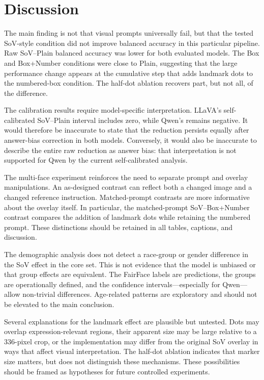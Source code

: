 \documentclass[lettersize,journal]{IEEEtran}
\begin{document}
\section{Discussion}
The main finding is not that visual prompts universally fail, but that the tested SoV-style condition did not improve balanced accuracy in this particular pipeline. Raw SoV--Plain balanced accuracy was lower for both evaluated models. The Box and Box+Number conditions were close to Plain, suggesting that the large performance change appears at the cumulative step that adds landmark dots to the numbered-box condition. The half-dot ablation recovers part, but not all, of the difference.

The calibration results require model-specific interpretation. LLaVA's self-calibrated SoV--Plain interval includes zero, while Qwen's remains negative. It would therefore be inaccurate to state that the reduction persists equally after answer-bias correction in both models. Conversely, it would also be inaccurate to describe the entire raw reduction as answer bias: that interpretation is not supported for Qwen by the current self-calibrated analysis.

The multi-face experiment reinforces the need to separate prompt and overlay manipulations. An as-designed contrast can reflect both a changed image and a changed reference instruction. Matched-prompt contrasts are more informative about the overlay itself. In particular, the matched-prompt SoV--Box+Number contrast compares the addition of landmark dots while retaining the numbered prompt. These distinctions should be retained in all tables, captions, and discussion.

The demographic analysis does not detect a race-group or gender difference in the SoV effect in the core set. This is not evidence that the model is unbiased or that group effects are equivalent. The FairFace labels are predictions, the groups are operationally defined, and the confidence intervals—especially for Qwen—allow non-trivial differences. Age-related patterns are exploratory and should not be elevated to the main conclusion.

Several explanations for the landmark effect are plausible but untested. Dots may overlap expression-relevant regions, their apparent size may be large relative to a 336-pixel crop, or the implementation may differ from the original SoV overlay in ways that affect visual interpretation. The half-dot ablation indicates that marker size matters, but does not distinguish these mechanisms. These possibilities should be framed as hypotheses for future controlled experiments.
\end{document}

